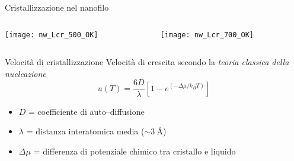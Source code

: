 \documentclass{beamer}
\begin{document}
\begin{frame}{Cristallizzazione nel nanofilo}
  \begin{columns}
   \begin{column}{0.5\textwidth}
    \texttt{[image: nw\_Lcr\_500\_OK]}
   \end{column}
   \begin{column}{0.5\textwidth}
    \texttt{[image: nw\_Lcr\_700\_OK]}
   \end{column}
  \end{columns}
  \begin{table}[h]
  \end{table}

\end{frame}




\begin{frame}{Velocità di cristallizzazione}
 Velocità di crescita secondo la \emph{teoria classica della nucleazione}
  \begin{equation*}
    u(T)= \frac{6D}{\lambda} \left[ 1- e^{ \left( -\Delta\mu/k_B T\right) } \right]
  \end{equation*}
  \begin{center}
  \begin{itemize}
   \item $D$ = coefficiente di auto--diffusione
   \item $\lambda$ = distanza interatomica media ($\sim \SI{3}{\angstrom}$)
   \item $\Delta\mu$ = differenza di potenziale chimico tra cristallo e liquido
  \end{itemize}  
  \end{center}
\end{frame}
\end{document}
